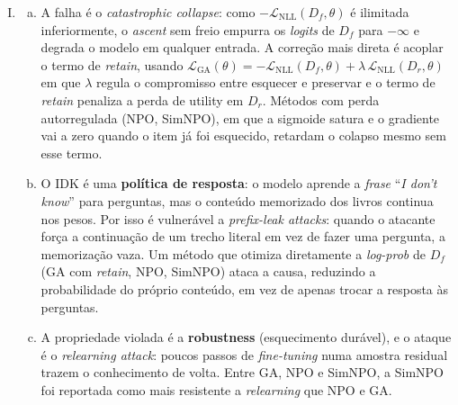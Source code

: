 \documentclass{dlproblemset}
\begin{document}
\begin{enumerate}[I)]
    \item
    \begin{enumerate}[(a)]
        \item A falha é o \textit{catastrophic collapse}: como $-\mathcal{L}_{\text{NLL}}(D_f,\theta)$ é ilimitada inferiormente, o \textit{ascent} sem freio empurra os \textit{logits} de $D_f$ para $-\infty$ e degrada o modelo em qualquer entrada. A correção mais direta é acoplar o termo de \textit{retain}, usando $\mathcal{L}_{\text{GA}}(\theta) = -\mathcal{L}_{\text{NLL}}(D_f,\theta) + \lambda\,\mathcal{L}_{\text{NLL}}(D_r,\theta)$ em que $\lambda$ regula o compromisso entre esquecer e preservar e o termo de \textit{retain} penaliza a perda de utility em $D_r$. Métodos com perda autorregulada (NPO, SimNPO), em que a sigmoide satura e o gradiente vai a zero quando o item já foi esquecido, retardam o colapso mesmo sem esse termo.
        \item O IDK é uma \textbf{política de resposta}: o modelo aprende a \textit{frase} ``\textit{I don't know}'' para perguntas, mas o conteúdo memorizado dos livros continua nos pesos. Por isso é vulnerável a \textit{prefix-leak attacks}: quando o atacante força a continuação de um trecho literal em vez de fazer uma pergunta, a memorização vaza. Um método que otimiza diretamente a \textit{log-prob} de $D_f$ (GA com \textit{retain}, NPO, SimNPO) ataca a causa, reduzindo a probabilidade do próprio conteúdo, em vez de apenas trocar a resposta às perguntas.
        \item A propriedade violada é a \textbf{robustness} (esquecimento durável), e o ataque é o \textit{relearning attack}: poucos passos de \textit{fine-tuning} numa amostra residual trazem o conhecimento de volta. Entre GA, NPO e SimNPO, a SimNPO foi reportada como mais resistente a \textit{relearning} que NPO e GA.
    \end{enumerate}
\end{enumerate}

\color{black}
\end{document}

